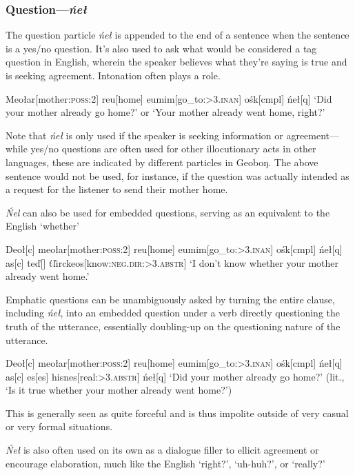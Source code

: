 \documentclass[10pt]{article}
\newcommand{\sk}{\textsc}
\newcommand{\vt}{ť}
\newcommand{\vd}{ď}
\newcommand{\vl}{ľ}
\newcommand{\engma}{ŋ}
\begin{document}
\subsubsection{Question---\textit{\'ne\l}}

The question particle \textit{\'ne\l} is appended to the end of a sentence when the sentence is a yes/no question. It's also used to ask what would be considered a tag question in English, wherein the speaker believes what they're saying is true and is seeking agreement. Intonation often plays a role.

\ex
\begingl
Meo\l ar[mother:\sk{poss:2}]
reu[home]
eumim[go\_to:\sk{>3.inan}]
o\'sk[\sc cmpl]
\'ne\l[\sc q]
\glft `Did your mother already go home?' or `Your mother already went home, right?'
\endgl 
\xe

Note that \textit{\'ne\l} is only used if the speaker is seeking information or agreement---while yes/no questions are often used for other illocutionary acts in other languages, these are indicated by different particles in Geobo{\engma}. The above sentence would not be used, for instance, if the question was actually intended as a request for the listener to send their mother home.

\textit{\'Nel} can also be used for embedded questions, serving as an equivalent to the English `whether'

\ex
\begingl
Deo\l[\sc c]
meo\l ar[mother:\sk{poss:2}]
reu[home]
eumim[go\_to:\sk{>3.inan}]
o\'sk[\sc cmpl]
\'ne\l[\sc q]
\nogloss{,}
as[\sc c]
te\vd[]
\vt\vl irckeos[know:\sk{neg.dir:>3.abstr}]
\glft `I don't know whether your mother already went home.'
\endgl
\xe

Emphatic questions can be unambiguously asked by turning the entire clause, including \textit{\'ne\l}, into an embedded question under a verb directly questioning the truth of the utterance, essentially doubling-up on the questioning nature of the utterance.

\ex
\begingl
Deo\l[\sc c]
meo\l ar[mother:\sk{poss:2}]
reu[home]
eumim[go\_to:\sk{>3.inan}]
o\'sk[\sc cmpl]
\'ne\l[\sc q]
\nogloss{,}
as[\sc c]
es[\sc es]
hisnes[real:\sk{>3.abstr}]
\'ne\l[\sc q]
\glft `Did your mother already go home?' (lit., `Is it true whether your mother already went home?')
\endgl 
\xe

This is generally seen as quite forceful and is thus impolite outside of very casual or very formal situations.

\textit{\'Ne\l} is also often used on its own as a dialogue filler to ellicit agreement or encourage elaboration, much like the English `right?', `uh-huh?', or `really?'
\end{document}
